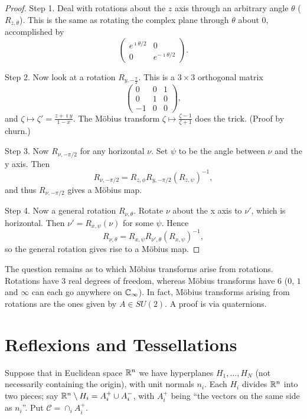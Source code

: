 \documentclass{notes}
\theoremstyle{plain}
\newcommand{\Cinf}{\C_\infty}
\newcommand{\cC}{\mathcal{C}}
\begin{document}
\begin{proof}

Step 1.  Deal with rotations about the $z$ axis through an arbitrary angle
$\theta$ ($R_{z,\theta}$).  This is the same as rotating the complex plane
through $\theta$ about $0$, accomplished by
\[
\left(
\begin{matrix}
e^{\imath \theta/2} & 0 \\
0 & e^{- \imath \theta/2}
\end{matrix}
\right).
\]

Step 2.  Now look at a rotation $R_{y,-\frac{\pi}{2}}$.  This is a $3 \times 3$
orthogonal matrix
\[
\left(
\begin{matrix}
0 & 0 & 1 \\
0 & 1 & 0 \\
-1 & 0 & 0
\end{matrix}
\right),
\]
and $\zeta \mapsto \zeta' = \frac{z + \imath y}{1-x}$.  The M\"{o}bius
transform $\zeta \mapsto \frac{\zeta - 1}{\zeta + 1}$ does the trick.  (Proof
by churn.)

Step 3.  Now $R_{\nu, - \pi/2}$ for any horizontal $\nu$.  Set $\psi$ to be
the angle between $\nu$ and the y axis.  Then
\[
R_{\nu, - \pi/2} = R_{z, \phi} R_{y,- \pi/2} \left( R_{z ,\psi}
\right)^{-1},
\] and thus $R_{\nu, - \pi/2}$ gives a M\"{o}bius map.

Step 4.  Now a general rotation $R_{\nu, \theta}$.  Rotate $\nu$ about the
x axis to $\nu'$, which is horizontal.  Then $\nu' = R_{x,\psi} (\nu)$ for
some $\psi$.  Hence
\[
R_{\nu, \theta} = R_{x, \psi} R_{\nu',\theta} \left( R_{x,\psi} \right)^{-1},
\]
so the general rotation gives rise to a M\"{o}bius map.
\end{proof}

The question remains as to which M\"{o}bius transforms arise from rotations.
Rotations have 3 real degrees of freedom, whereas M\"{o}bius transforms have 6
($0$, $1$ and $\infty$ can each go anywhere on $\Cinf$).  In fact, M\"{o}bius
transforms arising from rotations are the ones given by $A \in SU(2)$.  A proof
is via quaternions.

\chapter{Reflexions and Tessellations}

Suppose that in Euclidean space $\mathbb{R}^n$ we have hyperplanes $H_1, \dots, H_N$
(not necessarily containing the origin), with unit normals $n_i$.  Each
$H_i$ divides $\mathbb{R}^n$ into two pieces; say $\mathbb{R}^n \setminus H_i = A_i^+ \cup
A_i^-$, with $A_i^+$ being ``the vectors on the same side as $n_i$''.  Put
$\cC = \cap_i A_i^+$.
\end{document}
